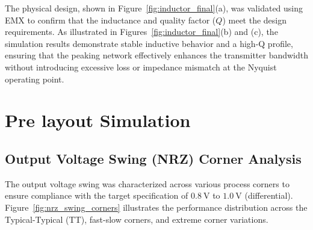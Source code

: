The physical design, shown in Figure~\ref{fig:inductor_final}(a), was validated using EMX to confirm that the inductance and quality factor ($Q$) meet the design requirements. As illustrated in Figures~\ref{fig:inductor_final}(b) and (c), the simulation results demonstrate stable inductive behavior and a high-Q profile, ensuring that the peaking network effectively enhances the transmitter bandwidth without introducing excessive loss or impedance mismatch at the Nyquist operating point.

\section{Pre layout Simulation}
\subsection{Output Voltage Swing (NRZ) Corner Analysis}
\label{sec:swing_results}

The output voltage swing was characterized across various process corners to ensure compliance with the target specification of $0.8~\text{V}$ to $1.0~\text{V}$ (differential). Figure~\ref{fig:nrz_swing_corners} illustrates the performance distribution across the Typical-Typical (TT), fast-slow corners, and extreme corner variations.

